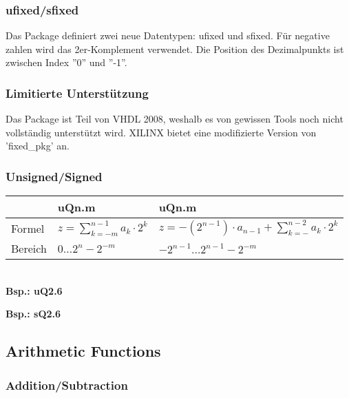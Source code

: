 \subsubsection{ufixed/sfixed}
Das Package definiert zwei neue Datentypen: ufixed und sfixed. Für negative zahlen wird das 2er-Komplement verwendet. Die Position des Dezimalpunkts ist zwischen Index ''0'' und ''-1''.


\subsubsection{Limitierte Unterstützung}
Das Package ist Teil von VHDL 2008, weshalb es von gewissen Tools noch nicht vollständig unterstützt wird. XILINX bietet eine modifizierte Version von 'fixed\_pkg' an.


\subsubsection{Unsigned/Signed}
\begin{tabular}{| l | l | l |}
\hline
&  uQn.m & uQn.m\\
\hline
Formel & $z=\sum_{k=-m}^{n-1}a_k \cdot 2^k$ & $z=-(2^{n-1}) \cdot a_{n-1} + \sum_{k=-}^{n-2}a_k \cdot 2^k$\\
\hline
Bereich & $0 \ldots 2^n-2^{-m}$ & $-2^{n-1} \ldots 2^{n-1}-2^{-m}$\\
\hline
\end{tabular}\\
\textbf{Bsp.: uQ2.6}

\textbf{Bsp.: sQ2.6}


\subsection{Arithmetic Functions}
\subsubsection{Addition/Subtraction}
